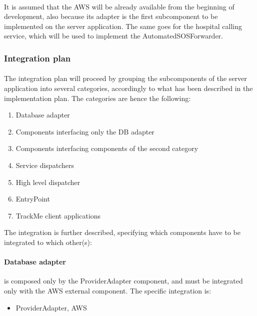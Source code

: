 \paragraph{} It is assumed that the AWS will be already available from the beginning of development, also because its adapter is the first subcomponent to be implemented on the server application. The same goes for the hospital calling service, which will be used to implement the AutomatedSOSForwarder.

{\color{secblue}\subsubsection{Integration plan}}
\paragraph{} The integration plan will proceed by grouping the subcomponents of the server application into several categories, accordingly to what has been described in the implementation plan. The categories are hence the following:
\newline
\begin{enumerate}
\item Database adapter
\item Components interfacing only the DB adapter
\item Components interfacing components of the second category
\item Service dispatchers
\item High level dispatcher
\item EntryPoint
\item TrackMe client applications
\end{enumerate}

The integration is further described, specifying which components have to be integrated to which other(s):
\paragraph {Database adapter} is composed only by the ProviderAdapter component, and must be integrated only with the AWS external component. The specific integration is:
\begin{itemize}
\item ProviderAdapter, AWS
\end{itemize}

